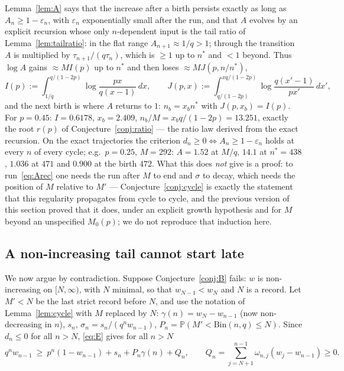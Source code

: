 \documentclass[11pt]{article}
\theoremstyle{definition}
\newcommand{\Bin}{\mathrm{Bin}}
\newcommand{\Prob}{\mathbb{P}}
\begin{document}
Lemma~\ref{lem:A} says that the increase after a birth persists
exactly as long as $A_n\ge1-\varepsilon_n$, with $\varepsilon_n$
exponentially small after the run, and that $A$ evolves by an
explicit recursion whose only $n$-dependent input is the tail ratio
of Lemma~\ref{lem:tailratio}: in the flat range $A_{n+1}\approx1/q>1$;
through the transition $A$ is multiplied by $\tau_{n+1}/(q\tau_n)$,
which is $\ge1$ up to $n^*$ and $<1$ beyond.  Thus $\log A$ gains
$\approx MI(p)$ up to $n^*$ and then loses $\approx MJ(p,n/n^*)$,
\begin{equation}\label{eq:IJ}
  I(p):=\int_{1/q}^{q/(1-2p)}\log\frac{px}{q(x-1)}\,dx,\qquad
  J(p,x):=\int_{q/(1-2p)}^{xq/(1-2p)}\log\frac{q(x'-1)}{px'}\,dx' ,
\end{equation}
and the next birth is where $A$ returns to $1$: $n_b=x_bn^*$ with
$J(p,x_b)=I(p)$.  For $p=0.45$: $I=0.6178$, $x_b=2.409$,
$n_b/M=x_bq/(1-2p)=13.251$, exactly the root $r(p)$ of
Conjecture~\ref{conj:ratio} --- the ratio law derived from the exact
recursion.  On the exact trajectories the criterion
$d_n\ge0\iff A_n\ge1-\varepsilon_n$ holds at every $n$ of every cycle;
e.g.\ $p=0.25$, $M=292$: $A=1.52$ at $M/q$, $14.1$ at $n^*=438$,
$1.036$ at $471$ and $0.900$ at the birth $472$.  What this does
\emph{not} give is a proof: to run~\eqref{eq:Arec} one needs the run
after $M$ to end and $\sigma$ to decay, which needs the position of
$M$ relative to $M'$ --- Conjecture~\ref{conj:cycle} is exactly the
statement that this regularity propagates from cycle to cycle, and
the previous version of this section proved that it does, under an
explicit growth hypothesis and for $M$ beyond an unspecified
$M_0(p)$; we do not reproduce that induction here.

\subsection{A non-increasing tail cannot start late}\label{sec:notail}

We now argue by contradiction.  Suppose Conjecture~\ref{conj:B} fails:
$w$ is non-increasing on $[N,\infty)$, with $N$ minimal, so that
$w_{N-1}<w_N$ and $N$ is a record.  Let $M'<N$ be the last strict
record before $N$, and use the notation of Lemma~\ref{lem:cycle} with
$M$ replaced by $N$: $\gamma(n)=w_N-w_{n-1}$ (now non-decreasing in
$n$), $s_n$, $\sigma_n=s_n/(q^nw_{n-1})$, $P_n=\Prob(M'<\Bin(n,q)\le N)$.
Since $d_n\le0$ for all $n>N$, \eqref{eq:E} gives for all $n>N$
\begin{equation}\label{eq:tailI}
  q^nw_{n-1}\ \ge\ p^n(1-w_{n-1})+s_n+P_n\gamma(n)+Q_n ,
  \qquad Q_n=\sum_{j=N+1}^{n-1}\omega_{n,j}(w_j-w_{n-1})\ge0 .
\end{equation}
\end{document}
